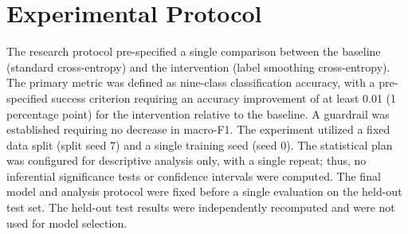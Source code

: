 \documentclass[10pt]{article}
\begin{document}
\section{Experimental Protocol}
The research protocol pre-specified a single comparison between the baseline (standard cross-entropy) and the intervention (label smoothing cross-entropy). The primary metric was defined as nine-class classification accuracy, with a pre-specified success criterion requiring an accuracy improvement of at least 0.01 (1 percentage point) for the intervention relative to the baseline. A guardrail was established requiring no decrease in macro-F1.
The experiment utilized a fixed data split (split seed 7) and a single training seed (seed 0). The statistical plan was configured for descriptive analysis only, with a single repeat; thus, no inferential significance tests or confidence intervals were computed. The final model and analysis protocol were fixed before a single evaluation on the held-out test set. The held-out test results were independently recomputed and were not used for model selection.
\end{document}
